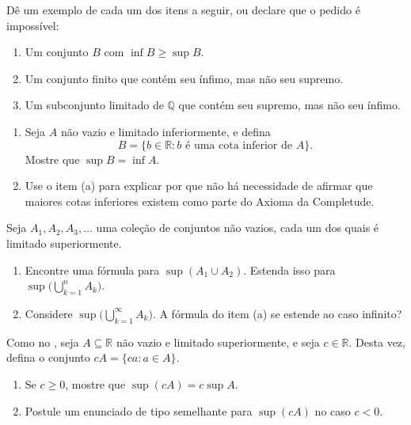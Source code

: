 \begin{exercise}\label{ex:exemplos-sup-inf}
Dê um exemplo de cada um dos itens a seguir, ou declare que o pedido é impossível:
\begin{enumerate}[label=\alph*)]
\item Um conjunto $B$ com $\inf B \geq \sup B$.
\item Um conjunto finito que contém seu ínfimo, mas não seu supremo.
\item Um subconjunto limitado de $\mathbb{Q}$ que contém seu supremo, mas não seu ínfimo.
\end{enumerate}
\end{exercise}

\begin{exercise}\label{ex:sup-cotas-inferiores}
\begin{enumerate}[label=\alph*)]
\item Seja $A$ não vazio e limitado inferiormente, e defina
\[
B = \{ b \in \mathbb{R} : b \text{ é uma cota inferior de } A \}.
\]
Mostre que $\sup B = \inf A$.
\item Use o item (a) para explicar por que não há necessidade de afirmar que maiores cotas inferiores existem como parte do Axioma da Completude.
\end{enumerate}
\end{exercise}

\begin{exercise}\label{ex:sup-uniao}
Seja $A_{1}, A_{2}, A_{3}, \ldots$ uma coleção de conjuntos não vazios, cada um dos quais é limitado superiormente.
\begin{enumerate}[label=\alph*)]
\item Encontre uma fórmula para $\sup(A_{1} \cup A_{2})$. Estenda isso para $\sup\bigl( \bigcup_{k=1}^{n} A_{k} \bigr)$.
\item Considere $\sup\bigl( \bigcup_{k=1}^{\infty} A_{k} \bigr)$. A fórmula do item (a) se estende ao caso infinito?
\end{enumerate}
\end{exercise}

\begin{exercise}\label{ex:sup-multiplicacao}
Como no , seja $A \subseteq \mathbb{R}$ não vazio e limitado superiormente, e seja $c \in \mathbb{R}$. Desta vez, defina o conjunto $cA = \{ ca : a \in A \}$.
\begin{enumerate}[label=\alph*)]
\item Se $c \geq 0$, mostre que $\sup(cA) = c \sup A$.
\item Postule um enunciado de tipo semelhante para $\sup(cA)$ no caso $c < 0$.
\end{enumerate}
\end{exercise}

